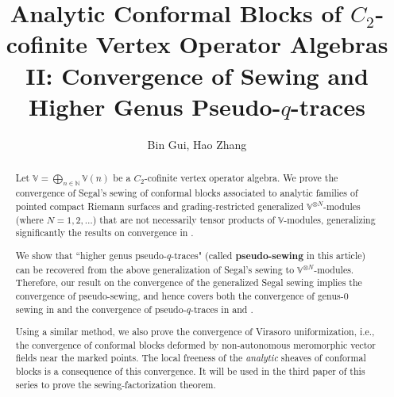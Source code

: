 \documentclass[11pt,b5paper,notitlepage]{article}
\title{Analytic Conformal Blocks of $C_2$-cofinite Vertex Operator Algebras II: Convergence of Sewing and Higher Genus Pseudo-$q$-traces}
\author{{\sc Bin Gui, Hao Zhang}
}
\date{}
\theoremstyle{definition}
\theoremstyle{plain}
\newcommand{\Vbb}{\mathbb V}
\newcommand{\Nbb}{\mathbb N}
\newcommand{\<}{\left\langle}
\renewcommand{\>}{\right\rangle}
\numberwithin{equation}{section}
\begin{document}
\sloppy %
	\setcounter{section}{-1}
	
	
	
	\maketitle
	
	
\newcommand\blfootnote[1]{%
	\begingroup
	\renewcommand\thefootnote{}\footnote{#1}%
	\addtocounter{footnote}{-1}%
	\endgroup
}



\begin{abstract}
Let $\Vbb=\bigoplus_{n\in\Nbb}\Vbb(n)$ be a $C_2$-cofinite vertex operator algebra. We prove the convergence of Segal's sewing of conformal blocks associated to analytic families of pointed compact Riemann surfaces and grading-restricted generalized $\Vbb^{\otimes N}$-modules (where $N=1,2,\dots$) that are not necessarily tensor products of $\Vbb$-modules, generalizing significantly the results on convergence in \cite{Gui-sewingconvergence}.

We show that ``higher genus pseudo-$q$-traces" (called \textbf{pseudo-sewing} in this article) can be recovered from the above generalization of Segal's sewing to $\Vbb^{\otimes N}$-modules. Therefore, our result on the convergence of the generalized Segal sewing implies the convergence of pseudo-sewing, and hence covers both the convergence of genus-$0$ sewing in \cite{Hua-differential-genus-0,HLZ7} and the convergence of pseudo-$q$-traces in \cite{Miy-modular-invariance} and \cite{Fio-genus-1}. 



Using a similar method, we also prove the convergence of Virasoro uniformization, i.e., the convergence of conformal blocks deformed by non-autonomous meromorphic vector fields near the marked points. The local freeness of the \textit{analytic} sheaves of conformal blocks is a consequence of this convergence. It will be used in the third paper of this series to prove the sewing-factorization theorem.
\end{abstract}

 


\tableofcontents
\end{document}
